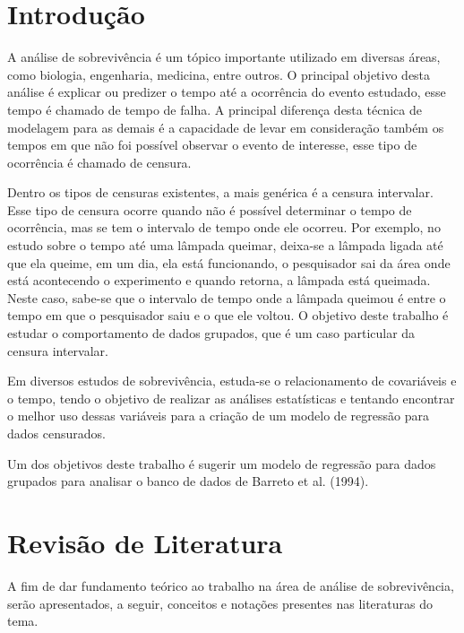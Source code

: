 \documentclass[a4paper,12pt]{article}
\begin{document}
\newpage
\pagestyle{plain}
\section{Introdução}
\noindent

A análise de sobrevivência é um tópico importante utilizado em diversas áreas, como biologia, engenharia, medicina, entre outros. O principal objetivo desta análise é explicar ou predizer o tempo até a ocorrência do evento estudado, esse tempo é chamado de tempo de falha. A principal diferença desta técnica de modelagem para as demais é a capacidade de levar em consideração também os tempos em que não foi possível observar o evento de interesse, esse tipo de ocorrência é chamado de censura.

Dentro os tipos de censuras existentes, a mais genérica é a censura intervalar. Esse tipo de censura ocorre quando não é possível determinar o tempo de ocorrência, mas se tem o intervalo de tempo onde ele ocorreu. Por exemplo, no estudo sobre o tempo até uma lâmpada queimar, deixa-se a lâmpada ligada até que ela queime, em um dia, ela está funcionando, o pesquisador sai da área onde está acontecendo o experimento e quando retorna, a lâmpada está queimada. Neste caso, sabe-se que o intervalo de tempo onde a lâmpada queimou é entre o tempo em que o pesquisador saiu e o que ele voltou. O objetivo deste trabalho é estudar o comportamento de dados grupados, que é um caso particular da censura intervalar.

Em diversos estudos de sobrevivência, estuda-se o relacionamento de covariáveis e o tempo, tendo o objetivo de realizar as análises estatísticas e tentando encontrar o melhor uso dessas variáveis para a criação de um modelo de regressão para dados censurados.

Um dos objetivos deste trabalho é sugerir um modelo de regressão para dados grupados para analisar o banco de dados de Barreto et al. (1994).

\section{Revisão de Literatura}

A fim de dar fundamento teórico ao trabalho na área de análise de sobrevivência, serão apresentados, a seguir, conceitos e notações presentes nas literaturas do tema.
\end{document}
